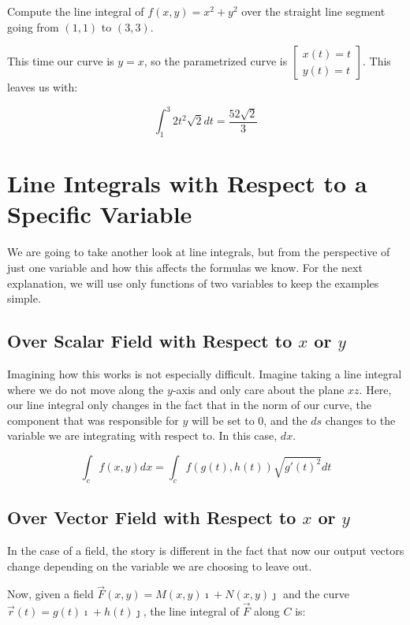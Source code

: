 Compute the line integral of \(f(x,y) = x^2 + y^2\) over the straight line segment going
from \((1,1)\) to \((3,3)\).

This time our curve is \(y = x\), so the parametrized curve is \(\begin{bmatrix}
    x(t) = t \\ y(t) = t
\end{bmatrix}\). This leaves us with:

\[
    \int_{1}^{3}  2t^2 \sqrt{2}dt = \frac{52\sqrt{2}}{3} 
\]

\section{Line Integrals with Respect to a Specific Variable}

We are going to take another look at line integrals, but from the perspective of just one variable and how 
this affects the formulas we know. For the next explanation, we will use only functions of two variables 
to keep the examples simple.

\subsection{Over Scalar Field with Respect to \texorpdfstring{\(x\) or \(y\)}{}}

Imagining how this works is not especially difficult. Imagine taking a line integral where we do not move 
along the \(y\)-axis and only care about the plane \(xz\). Here, our line integral only changes in the 
fact that in the norm of our curve, the component that was responsible for \(y\) will be set to 0, and the 
\(ds\) changes to the variable we are integrating with respect to. In this case, \(dx\).

\[
    \int_{c} f(x,y)dx = \int_{c} f(g(t), h(t)) \sqrt{g'(t)^2}dt 
\]

\subsection{Over Vector Field with Respect to \texorpdfstring{\(x\) or \(y\)}{}}

In the case of a field, the story is different in the fact that now our output vectors change depending 
on the variable we are choosing to leave out.

Now, given a field \(\vec{F}(x,y) = M(x,y)\imath + N(x,y)\jmath\) and the curve
 \(\vec{r}(t) = g(t)\imath + h(t)\jmath\), the line integral of \(\vec{F}\) along \(C\) is:

